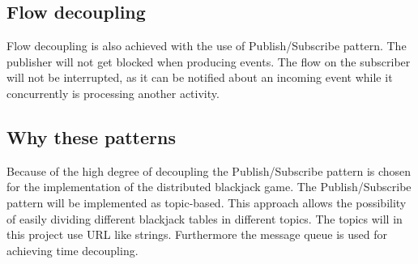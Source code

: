\FloatBarrier

\subsection{Flow decoupling}
Flow decoupling is also achieved with the use of Publish/Subscribe pattern. The publisher will not get blocked when producing events. The flow on the subscriber will not be interrupted, as it can be notified about an incoming event while it concurrently is processing another activity.

\subsection{Why these patterns}
Because of the high degree of decoupling the Publish/Subscribe pattern is chosen for the implementation of the distributed blackjack game. 
The Publish/Subscribe pattern will be implemented as topic-based. This approach allows the possibility of easily dividing different blackjack tables in different topics. The topics will in this project use URL like strings. Furthermore the message queue is used for achieving time decoupling.
